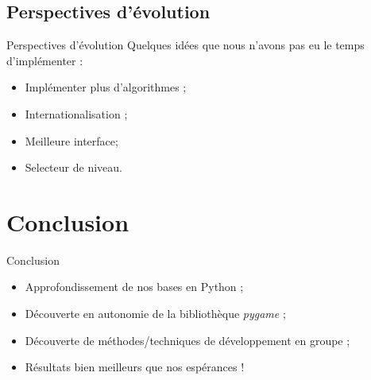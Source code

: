 \documentclass{beamer}
\begin{document}
\subsection{Perspectives d'évolution}
	\begin{frame}{Perspectives d'évolution}
		Quelques idées que nous n'avons pas eu le temps d'implémenter :
		\begin{itemize}
		\setlength{\itemsep}{0.3cm}
			\item Implémenter plus d'algorithmes ;
			\item Internationalisation ;
			\item Meilleure interface;
            \item Selecteur de niveau.
		\end{itemize}
	\end{frame}

\section{Conclusion}
	\begin{frame}{Conclusion}
		\begin{itemize}
		\setlength{\itemsep}{0.4cm}
			\item Approfondissement de nos bases en Python ;
			\item Découverte en autonomie de la bibliothèque \emph{pygame} ;
			\item Découverte de méthodes/techniques de développement en groupe ;
			\item Résultats bien meilleurs que nos espérances !
		\end{itemize}
	\end{frame}
\end{document}
